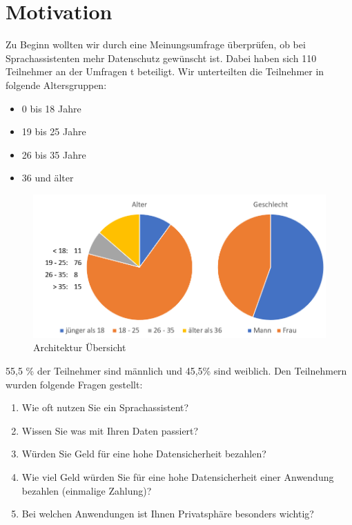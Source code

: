 \section{Motivation}

Zu Beginn wollten wir durch eine Meinungsumfrage überprüfen, ob bei Sprachassistenten mehr Datenschutz gewünscht ist. Dabei haben sich 110 Teilnehmer an der Umfragen t beteiligt. Wir unterteilten die Teilnehmer in folgende Altersgruppen:

\begin{itemize}
	\item 0 bis 18 Jahre 
	\item 19 bis 25 Jahre
	\item 26 bis 35 Jahre
	\item 36 und älter	
\end{itemize}

\begin{figure}[h!]
	\centering
	\includegraphics[width=0.7\linewidth]{Picture/umfrage_teilnehmer}
	\caption[Architektur Übersicht]{Architektur Übersicht}
	\label{fig:umfrage_teilnehmer}
\end{figure}

55,5 \% der Teilnehmer sind männlich und 45,5\% sind weiblich. Den Teilnehmern wurden folgende Fragen gestellt:

\begin{enumerate}
	
	\item Wie oft nutzen Sie ein Sprachassistent?
	\item Wissen Sie was mit Ihren Daten passiert?
	\item Würden Sie Geld für eine hohe Datensicherheit bezahlen?
	\item Wie viel Geld würden Sie für eine hohe Datensicherheit einer Anwendung bezahlen (einmalige Zahlung)?
	\item Bei welchen Anwendungen ist Ihnen Privatsphäre besonders wichtig?
	
\end{enumerate}

